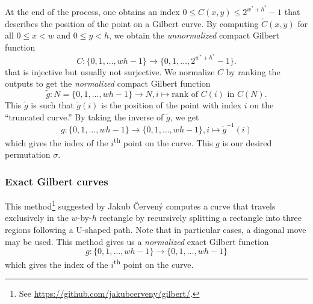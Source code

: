 \documentclass[12pt, a4paper, twoside]{article}
\begin{document}
At the end of the process, one obtains an index $0 \leq C(x, y) \leq 2^{w^* + h^*} - 1$ that describes the position of the point on a Gilbert curve. By computing $\tilde{C}(x, y)$ for all $0 \leq x < w$ and $0 \leq y < h$, we obtain the \emph{unnormalized} compact Gilbert function
\begin{equation}
    C\colon \{0, 1, \ldots, w h - 1\} \to \{0, 1, \ldots, 2^{w^* + h^*} - 1\}.
\end{equation}
that is injective but usually not surjective. We normalize $C$ by ranking the outputs to get the \emph{normalized} compact Gilbert function
\begin{equation}
    \tilde{g}\colon N = \{0, 1, \ldots, w h - 1\} \to N, i \mapsto \text{rank of $C(i)$ in $C(N)$}.
\end{equation}
This $\tilde{g}$ is such that $\tilde{g}(i)$ is the position of the point with index $i$ on the ``truncated curve.'' By taking the inverse of $\tilde{g}$, we get
\begin{equation}
    g\colon \{0, 1, \ldots, w h - 1\} \to \{0, 1, \ldots, w h - 1\}, i \mapsto \tilde{g}^{-1}(i)
\end{equation}
which gives the index of the $i$\textsuperscript{th} point on the curve. This $g$ is our desired permutation $\sigma$.

\subsubsection{Exact Gilbert curves}

This method\footnote{See \url{https://github.com/jakubcerveny/gilbert/}.} suggested by Jakub Červený computes a curve that travels exclusively in the $w$-by-$h$ rectangle by recursively splitting a rectangle into three regions following a U-shaped path. Note that in particular cases, a diagonal move may be used. This method gives us a \emph{normalized} exact Gilbert function
\begin{equation}
    g\colon \{0, 1, \ldots, w h - 1\} \to \{0, 1, \ldots, w h - 1\}
\end{equation}
which gives the index of the $i$\textsuperscript{th} point on the curve.
\end{document}
